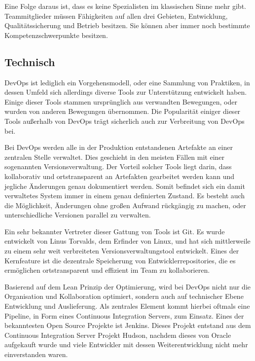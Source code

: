 Eine Folge daraus ist, dass es keine Spezialisten im klassischen Sinne mehr gibt. Teammitglieder müssen Fähigkeiten auf allen drei Gebieten, Entwicklung, Qualitätssicherung und Betrieb besitzen. 
Sie können aber immer noch bestimmte Kompetenzschwerpunkte besitzen. \parencite[Vgl.][S. 7]{sacks:2012}

\subsection{Technisch}
DevOps ist lediglich ein Vorgehensmodell, oder eine Sammlung von Praktiken, in dessen Umfeld sich allerdings diverse Tools zur Unterstützung entwickelt haben. 
Einige dieser Tools stammen ursprünglich aus verwandten Bewegungen, oder wurden von anderen Bewegungen übernommen. 
Die Popularität einiger dieser Tools außerhalb von DevOps trägt sicherlich auch zur Verbreitung von DevOps bei.

Bei DevOps werden alle in der Produktion entstandenen Artefakte an einer zentralen Stelle verwaltet. 
Dies geschieht in den meisten Fällen mit einer sogenannten Versionsverwaltung. 
Der Vorteil solcher Tools liegt darin, dass kollaborativ und ortstransparent an Artefakten gearbeitet werden kann und jegliche Änderungen genau dokumentiert werden. 
Somit befindet sich ein damit verwaltetes System immer in einem genau definierten Zustand. 
Es besteht auch die Möglichkeit, Änderungen ohne großen Aufwand rückgängig zu machen, oder unterschiedliche Versionen parallel zu verwalten. \parencite[Vgl.][S. 9]{fisher-miranda:2014}

Ein sehr bekannter Vertreter dieser Gattung von Tools ist Git. 
Es wurde entwickelt von Linus Torvalds, dem Erfinder von Linux, und hat sich mittlerweile zu einem sehr weit verbreiteten Versionsverwaltungstool entwickelt. 
Eines der Kernfeature ist die dezentrale Speicherung von Entwicklerrepositories, die es ermöglichen ortstransparent und effizient im Team zu kollaborieren. 
\parencite[Vgl.][S. 29 - 44]{loeliger:2012}

Basierend auf dem Lean Prinzip der Optimierung, wird bei DevOps nicht nur die Organisation und Kollaboration optimiert, sondern auch auf technischer Ebene Entwicklung und Auslieferung. 
Als zentrales Element kommt hierbei oftmals eine Pipeline, in Form eines Continuous Integration Servers, zum Einsatz. 
Eines der bekanntesten Open Source Projekte ist Jenkins. 
Dieses Projekt entstand aus dem Continuous Integration Server Projekt Hudson, nachdem dieses von Oracle aufgekauft wurde und viele Entwickler mit dessen Weiterentwicklung nicht mehr einverstanden waren. \parencite[Vgl.][S. 4]{smart:2011}

